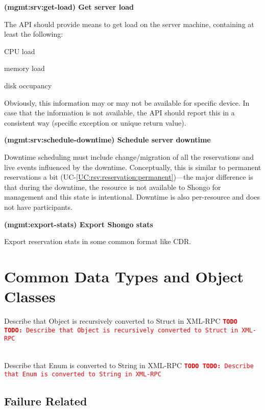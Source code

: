 \documentclass[a4paper]{report}
\makeatletter
\newcounter{UCcounter}
\newenvironment{UseCases}%
	{\begin{list}{\textbf{UC-\arabic{UCcounter}}}{\@nmbrlisttrue\def\@listctr{UCcounter}}}%
	{\end{list}}
\newcommand{\UClabel}[1]{\label{UC:#1}}
\newcommand{\UCref}[1]{UC-\ref{UC:#1}}
\newcommand{\UseCase}[2]{\item\UClabel{#2} \textbf{(#2) #1}\\ \nopagebreak}
\newcommand{\TODO}[1]{%
\def\empty{}%
\def\prvniparametr{#1}%
\ifx\prvniparametr\empty%
\begingroup\tt\textcolor{red}{\noindent\textbf{TODO}}\endgroup
\else%
\begingroup\tt\textcolor{red}{\noindent\textbf{TODO:}\ #1}\endgroup
\fi%
}
\makeatother
\begin{document}
\begin{UseCases}

\UseCase{Get server load}{mgmt:srv:get-load}

The API should provide means to get load on the server machine, containing at
least the following:

\begin{compactitem}

\item CPU load

\item memory load

\item disk occupancy

\end{compactitem}

Obviously, this information may or may not be available for specific device.
In case that the information is not available, the API should report this in a
consistent way (specific exception or unique return value).


\UseCase{Schedule server downtime}{mgmt:srv:schedule-downtime}

Downtime scheduling must include change/migration of all the reservations and
live events influenced by the downtime. Conceptually, this is similar to
permanent reservations a bit (\UCref{rsv:reservation:permanent})---the major
difference is that during the downtime, the resource is not available to Shongo
for management and this state is intentional. Downtime is also per-resource and
does not have participants.

\UseCase{Export Shongo stats}{mgmt:export-stats}

Export reservation stats in some common format like CDR.

\end{UseCases}




\chapter{Common Data Types and Object Classes}

\TODO{Describe that Object is recursively converted to Struct in XML-RPC}
\\ \TODO{Describe that Enum is converted to String in XML-RPC}

\section{Failure Related}
\end{document}
